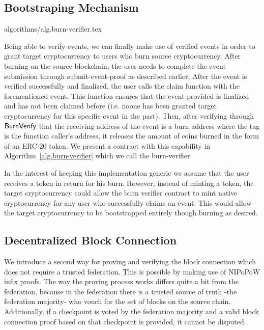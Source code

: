 \subsection{Bootstraping Mechanism}
{algorithms/alg.burn-verifier.tex}

Being able to verify events, we can finally make use of verified events in order to grant target cryptocurrency to users who burn source cryptocurrency. After burning on the source blockchain, the user needs to complete the event submission through \textsf{submit-event-proof} as described earlier. After the event is verified successfully and finalized, the user calls the \textsf{claim} function with the forementioned event. This function ensures that the event provided is finalized and has not been claimed before (i.e. noone has been granted target cryptocurrency for this specific event in the past). Then, after verifying through $\mathsf{BurnVerify}$ that the receiving address of the event is a burn address where the tag is the function caller's address, it releases the amount of coins burned in the form of an ERC-20 token. We present a contract with this capability in Algorithm~\ref{alg.burn-verifier} which we call the \textsf{burn-verifier}.

In the interest of keeping this implementation generic we assume that the user receives a token in return for his burn. However, instead of minting a token, the target cryptocurrency could allow the burn verifier contract to mint native cryptocurrency for any user who successfully claims an event. This would allow the target cryptocurrency to be bootstrapped entirely though burning as desired.


\subsection{Decentralized Block Connection}
We introduce a second way for proving and verifying the block connection which does not require a trusted federation. This is possible by making use of NIPoPoW infix proofs. The way the proving process works differs quite a bit from the federation, because in the federation there is a trusted source of truth -the federation majority- who vouch for the set of blocks on the source chain. Additionally, if a checkpoint is voted by the federation majority and a valid block connection proof based on that checkpoint is provided, it cannot be disputed.

